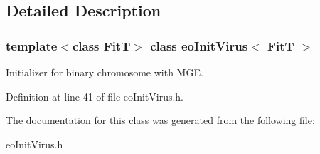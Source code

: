 \subsection{Detailed Description}
\subsubsection*{template$<$class Fit\-T$>$ class eo\-Init\-Virus$<$ Fit\-T $>$}

Initializer for binary chromosome with MGE. 



Definition at line 41 of file eo\-Init\-Virus.h.

The documentation for this class was generated from the following file:\begin{CompactItemize}
\item 
eo\-Init\-Virus.h\end{CompactItemize}
